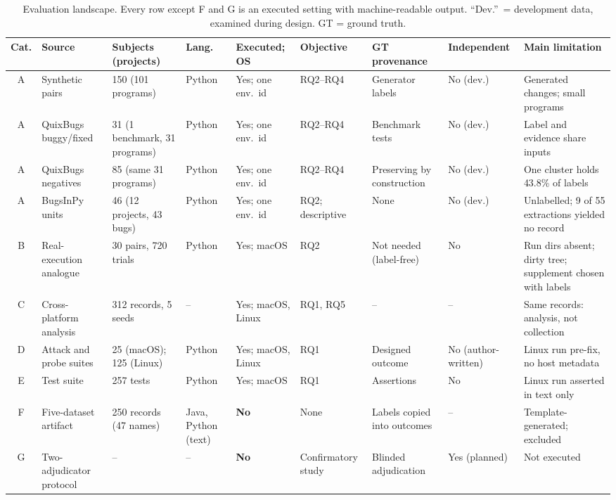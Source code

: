 \begin{table}[!t]
\caption{Evaluation landscape. Every row except F and G is an executed setting with machine-readable output. ``Dev.''\ = development data, examined during design. GT = ground truth.}
\label{tab:benchmarks}
\centering
\scriptsize
\setlength{\tabcolsep}{2.4pt}
\renewcommand{\arraystretch}{1.08}
\begin{tabular}{|c|L{2.6cm}|L{2.1cm}|L{0.9cm}|L{1.25cm}|L{1.9cm}|L{2.3cm}|L{1.3cm}|L{3.2cm}|}
\hline
Cat. & Source & Subjects (projects) & Lang. & Executed; OS & Objective & GT provenance & Independent & Main limitation \\
\hline
A & Synthetic pairs & 150 (101 programs) & Python & Yes; one env.\ id & RQ2--RQ4 & Generator labels & No (dev.) & Generated changes; small programs \\
A & QuixBugs~\cite{lin2017quixbugs} buggy/fixed & 31 (1 benchmark, 31 programs) & Python & Yes; one env.\ id & RQ2--RQ4 & Benchmark tests & No (dev.) & Label and evidence share inputs \\
A & QuixBugs negatives & 85 (same 31 programs) & Python & Yes; one env.\ id & RQ2--RQ4 & Preserving by construction & No (dev.) & One cluster holds 43.8\% of labels \\
A & BugsInPy~\cite{widyasari2020bugsinpy} units & 46 (12 projects, 43 bugs) & Python & Yes; one env.\ id & RQ2; descriptive & None & No (dev.) & Unlabelled; 9 of 55 extractions yielded no record \\
B & Real-execution analogue & 30 pairs, 720 trials & Python & Yes; macOS & RQ2 & Not needed (label-free) & No & Run dirs absent; dirty tree; supplement chosen with labels \\
C & Cross-platform analysis & 312 records, 5 seeds & -- & Yes; macOS, Linux & RQ1, RQ5 & -- & -- & Same records: analysis, not collection \\
D & Attack and probe suites & 25 (macOS); 125 (Linux) & Python & Yes; macOS, Linux & RQ1 & Designed outcome & No (author-written) & Linux run pre-fix, no host metadata \\
E & Test suite & 257 tests & Python & Yes; macOS & RQ1 & Assertions & No & Linux run asserted in text only \\
\hline
F & Five-dataset artifact & 250 records (47 names) & Java, Python (text) & \textbf{No} & None & Labels copied into outcomes & -- & Template-generated; excluded \\
G & Two-adjudicator protocol & -- & -- & \textbf{No} & Confirmatory study & Blinded adjudication & Yes (planned) & Not executed \\
\hline
\end{tabular}
\end{table}

